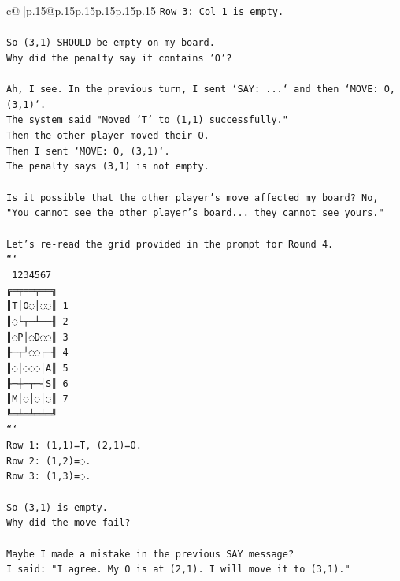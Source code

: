 \documentclass{article}
\begin{document}
{\begin{supertabular}{c@{$\;$}|p{.15\linewidth}@{}p{.15\linewidth}p{.15\linewidth}p{.15\linewidth}p{.15\linewidth}p{.15\linewidth}}
{{{\texttt{Row 3: Col 1 is empty.} \\
\\ 
\texttt{So (3,1) SHOULD be empty on my board.} \\
\texttt{Why did the penalty say it contains 'O'?} \\
\\ 
\texttt{Ah, I see. In the previous turn, I sent `SAY: ...` and then `MOVE: O, (3,1)`.} \\
\texttt{The system said "Moved 'T' to (1,1) successfully."} \\
\texttt{Then the other player moved their O.} \\
\texttt{Then I sent `MOVE: O, (3,1)`.} \\
\texttt{The penalty says (3,1) is not empty.} \\
\\ 
\texttt{Is it possible that the other player's move affected my board? No, "You cannot see the other player's board... they cannot see yours."} \\
\\ 
\texttt{Let's re{-}read the grid provided in the prompt for Round 4.} \\
\texttt{```} \\
\texttt{ 1234567} \\
\texttt{╔═╤══╤══╗} \\
\texttt{║T│O◌│◌◌║ 1} \\
\texttt{║◌└┬─┴──╢ 2} \\
\texttt{║◌P│◌D◌◌║ 3} \\
\texttt{╟─┬┘◌◌┌─╢ 4} \\
\texttt{║◌│◌◌◌│A║ 5} \\
\texttt{╟─┼─┬─┤S║ 6} \\
\texttt{║M│◌│◌│◌║ 7} \\
\texttt{╚═╧═╧═╧═╝} \\
\texttt{```} \\
\texttt{Row 1: (1,1)=T, (2,1)=O.} \\
\texttt{Row 2: (1,2)=◌.} \\
\texttt{Row 3: (1,3)=◌.} \\
\\ 
\texttt{So (3,1) is empty.} \\
\texttt{Why did the move fail?} \\
\\ 
\texttt{Maybe I made a mistake in the previous SAY message?} \\
\texttt{I said: "I agree. My O is at (2,1). I will move it to (3,1)."} \\
}}}
\end{supertabular}}
\end{document}
